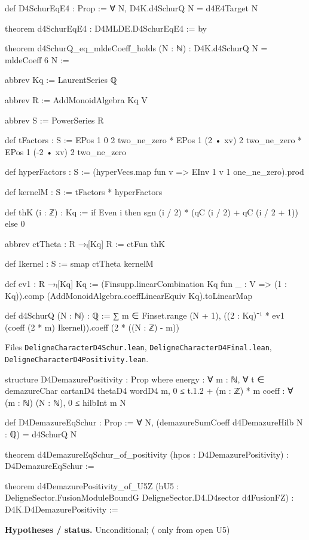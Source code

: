 \documentclass[11pt,openany]{book}
\newcommand{\lean}[1]{\texttt{\detokenize{#1}}}
\newcommand{\leanpath}[1]{\texttt{\small #1}}
\theoremstyle{definition}
\theoremstyle{plain}
\begin{document}
\begin{leancode}
def D4SchurEqE4 : Prop := ∀ N, D4K.d4SchurQ N = d4E4Target N

theorem d4SchurEqE4 : D4MLDE.D4SchurEqE4 := by

theorem d4SchurQ_eq_mldeCoeff_holds (N : ℕ) : D4K.d4SchurQ N = mldeCoeff 6 N :=
\end{leancode}
\begin{leancode}
abbrev Kq := LaurentSeries ℚ

abbrev R := AddMonoidAlgebra Kq V

abbrev S := PowerSeries R

def tFactors : S :=
  EPos 1 0 2 two_ne_zero * EPos 1 (2 • xv) 2 two_ne_zero * EPos 1 (-2 • xv) 2 two_ne_zero

def hyperFactors : S := (hyperVecs.map fun v => EInv 1 v 1 one_ne_zero).prod

def kernelM : S := tFactors * hyperFactors

def thK (i : ℤ) : Kq := if Even i then sgn (i / 2) * (qC (i / 2) + qC (i / 2 + 1)) else 0

abbrev ctTheta : R →ₗ[Kq] R := ctFun thK

def Ikernel : S := smap ctTheta kernelM

def ev1 : R →ₗ[Kq] Kq :=
  (Finsupp.linearCombination Kq fun _ : V => (1 : Kq)).comp
    (AddMonoidAlgebra.coeffLinearEquiv Kq).toLinearMap

def d4SchurQ (N : ℕ) : ℚ :=
  ∑ m ∈ Finset.range (N + 1), ((2 : Kq)⁻¹ * ev1 (coeff (2 * m) Ikernel)).coeff (2 * ((N : ℤ) - m))
\end{leancode}
{\raggedright\noindent Files \leanpath{DeligneCharacterD4Schur.lean}, \leanpath{DeligneCharacterD4Final.lean},
\leanpath{DeligneCharacterD4Positivity.lean}.\par}
\begin{leancode}
structure D4DemazurePositivity : Prop where
  energy : ∀ m : ℕ, ∀ t ∈ demazureChar cartanD4 thetaD4 wordD4 m, 0 ≤ t.1.2 + (m : ℤ) * m
  coeff : ∀ (m : ℕ) (N : ℕ), 0 ≤ hilbInt m N

def D4DemazureEqSchur : Prop := ∀ N, (demazureSumCoeff d4DemazureHilb N : ℚ) = d4SchurQ N

theorem d4DemazureEqSchur_of_positivity (hpos : D4DemazurePositivity) : D4DemazureEqSchur :=

theorem d4DemazurePositivity_of_U5Z
    (hU5 : DeligneSector.FusionModuleBoundG DeligneSector.D4.D4sector d4FusionFZ) :
    D4K.D4DemazurePositivity :=
\end{leancode}
\noindent\textbf{Hypotheses / status.} Unconditional; \lean{D4DemazurePositivity} (\lean{coeff} only from open U5)\par
\medskip
\endgroup
\setcounter{chapter}{25}
\end{document}
